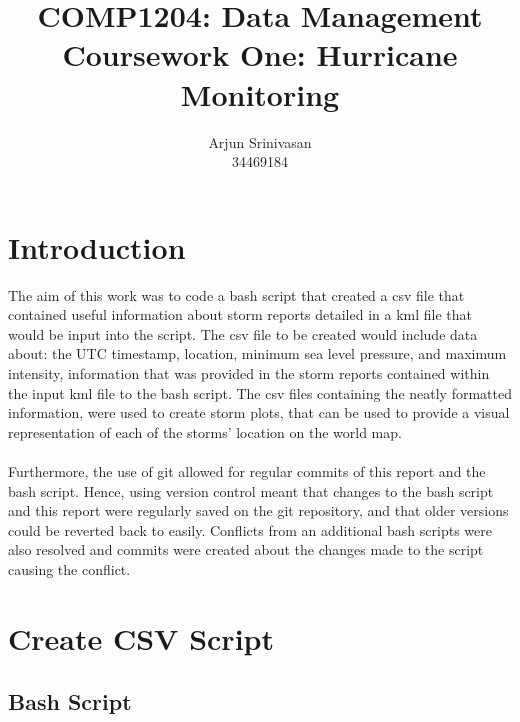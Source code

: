 \documentclass[]{article} %
\title{COMP1204: Data Management \\ Coursework One: Hurricane Monitoring}
\author{Arjun Srinivasan \\ 34469184} %
\begin{document}

\maketitle %

\section{Introduction\\} %
The aim of this work was to code a bash script that created a csv file that contained useful information about storm reports detailed in a kml file that would be input into the script. The csv file to be created would include data about: the UTC timestamp, location, minimum sea level pressure, and maximum intensity, information that was provided in the storm reports contained within the input kml file to the bash script. The csv files containing the neatly formatted information, were used to create storm plots, that can be used to provide a visual representation of each of the storms' location on the world map.
\\\\ %
Furthermore, the use of git allowed for regular commits of this report and the bash script. Hence, using version control meant that changes to the bash script and this report were regularly saved on the git repository, and that older versions could be reverted back to easily. Conflicts from an additional bash scripts were also resolved and commits were created about the changes made to the script causing the conflict.

\section{Create CSV Script\\} %
\subsection{Bash Script} %
\end{document}

